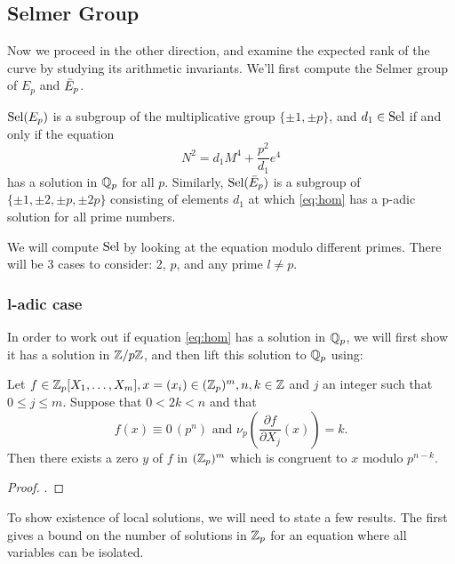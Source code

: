 \documentclass[12pt, a4paper]{amsart}
\begin{document}
\subsection{Selmer Group}

Now we proceed in the other direction, and examine the expected rank of the
curve by studying its arithmetic invariants. We'll first compute the Selmer
group of $E_p$ and $\bar{E}_p$.

\begin{prop}
  $\text{\normalfont Sel}(E_p)$ is a subgroup of the multiplicative group
  $ \{ \pm 1, \pm p \}$, and $d_1 \in \text{\normalfont Sel}$ if and only if the equation
  \begin{equation} \label{eq:hom}
    N^2 = d_1 M^4 + \frac{p^2}{d_1}e^4
  \end{equation}
  has a solution in ${\mathbb Q}_p$ for all $p$.
  Similarly, $\text{\normalfont Sel}(\bar{E}_p)$ is a subgroup of $\{\pm 1, \pm 2, \pm p, \pm 2p\}$
  consisting of elements $d_1$ at which \ref{eq:hom} has a p-adic solution for
  all prime numbers.
\end{prop}

We will compute $\text{\normalfont Sel}$ by looking at the equation modulo different primes.
There will be 3 cases to consider: 2, $p$, and any prime $l \neq p$.

\subsubsection{l-adic case}

In order to work out if equation \ref{eq:hom} has a solution in ${\mathbb Q}_p$,
we will first show it has a solution 
in ${\mathbb Z}/p{\mathbb Z}$, and then lift this solution to ${\mathbb Q}_p$ using:

\begin{prop}
  Let $f \in {\mathbb Z}_p[X_1,\dots,X_m], x = (x_i) \in ({\mathbb Z}_p)^m, n, k \in {\mathbb Z}$ and
  $j$ an integer such that $0 \leq j \leq m$. Suppose that $0 < 2k < n$ and that
  \[ f(x) \equiv 0 \, (p^n) \text { and } \nu_p
    \left(\frac{\partial f}{\partial X_j} (x) \right) = k.\]
  Then there exists a zero $y$ of $f$ in $({\mathbb Z}_p)^m$ which is congruent to $x$
  modulo $p^{n-k}$.
\end{prop}
\begin{proof}
  \cite[See][Chapter 2-2, page 14]{Serre}.
\end{proof}

To show existence of local solutions, we will need to state a few results.
The first gives a bound on the number of solutions in ${\mathbb Z}_p$ for an equation
where all variables can be isolated.
\end{document}
